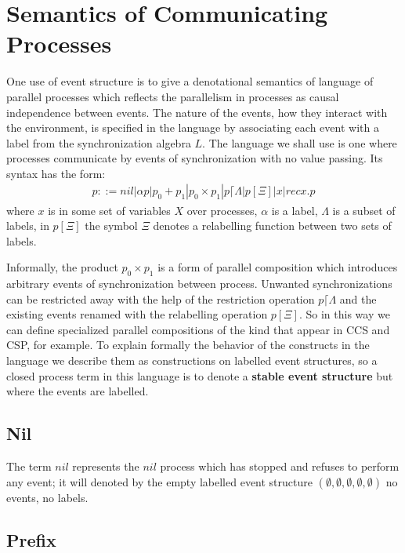 \documentclass{article}
\begin{document}
\section{Semantics of Communicating Processes}
One use of event structure is to give a denotational semantics of language of parallel
processes which reflects the parallelism in processes as causal independence between events.
The nature of the events, how they interact with the environment,
is specified in the language by associating each event with a label from the synchronization
algebra $L$.
The language we shall use is one where processes communicate by events of synchronization
with no value passing.
Its syntax has the form:
\begin{align*}
    p ::= nil | \alpha p | p_0 + p_1 | p_0 \times p_1 | p\lceil \Lambda | p[\Xi] | x | recx.p
\end{align*}
where $x$ is in some set of variables $X$ over processes, $\alpha$ is a label,
$\Lambda$ is a subset of labels, in $p[\Xi]$ the symbol $\Xi$ denotes a relabelling function between
two sets of labels.

Informally, the product $p_0 \times p_1$ is a form of parallel composition which introduces
arbitrary events of synchronization between process.
Unwanted synchronizations can be restricted away with the help of the restriction operation
$p\lceil \Lambda$ and the existing events renamed with the relabelling operation $p[\Xi]$.
So in this way we can define specialized parallel compositions of the kind that appear in
CCS and CSP, for example.
To explain formally the behavior of the constructs in the language we describe them as
constructions on labelled event structures, so a closed process term in this language is to
denote a \textbf{stable event structure} but where the events are labelled.

\subsection{Nil}
The term $nil$ represents the $nil$ process which has stopped and refuses to perform any event;
it will denoted by the empty labelled event structure $(\emptyset,\emptyset,\emptyset,\emptyset,\emptyset)$
no events, no labels.

\subsection{Prefix}
\end{document}
